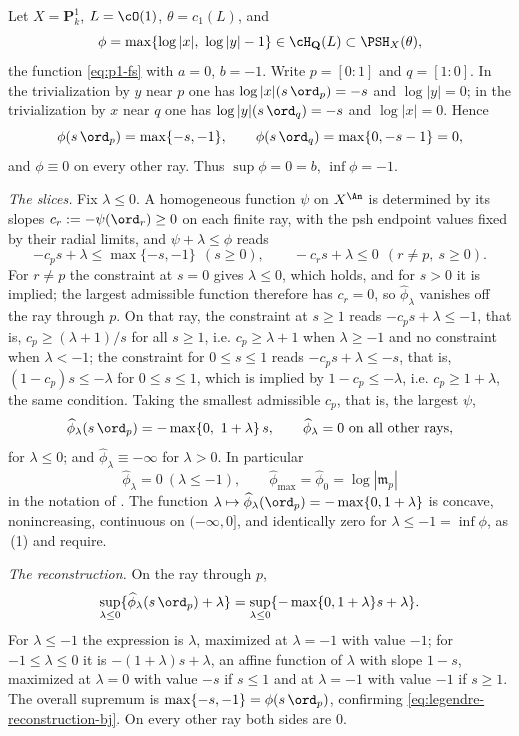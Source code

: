 \begin{example}
\label{ex:ch35-legendre-pair-p1}
Let $X=\mathbf P^1_k$, $L=\cO(1)$, $\theta=c_1(L)$, and
\[
 \phi=\max\{\log|x|,\ \log|y|-1\}
 \in\cH_{\mathbf Q}(L)\subset\PSH_X(\theta),
\]
the function \eqref{eq:p1-fs} with $a=0$, $b=-1$.  Write
$p=[0:1]$ and $q=[1:0]$.  In the trivialization by $y$ near $p$ one
has $\log|x|(s\,\ord_p)=-s$ and $\log|y|=0$; in the trivialization by
$x$ near $q$ one has $\log|y|(s\,\ord_q)=-s$ and $\log|x|=0$.
Hence
\[
 \phi(s\,\ord_p)=\max\{-s,-1\},
 \qquad
 \phi(s\,\ord_q)=\max\{0,-s-1\}=0,
\]
and $\phi\equiv0$ on every other ray.  Thus $\sup\phi=0=b$,
$\inf\phi=-1$.

\emph{The slices.}  Fix $\lambda\leq0$.  A homogeneous function
$\psi$ on $X^{\An}$ is determined by its slopes
$c_r:=-\psi(\ord_r)\geq0$ on each finite ray, with the psh endpoint
values fixed by their radial limits, and
$\psi+\lambda\leq\phi$ reads
\[
 -c_ps+\lambda\leq\max\{-s,-1\}\ \ (s\geq0),
 \qquad
 -c_rs+\lambda\leq0\ \ (r\neq p,\ s\geq0).
\]
For $r\neq p$ the constraint at $s=0$ gives $\lambda\leq0$, which
holds, and for $s>0$ it is implied; the largest admissible function therefore has
$c_r=0$, so $\widehat\phi_\lambda$ vanishes off the ray
through $p$.  On that ray, the constraint at $s\geq1$ reads
$-c_ps+\lambda\leq-1$, that is,
$c_p\geq(\lambda+1)/s$ for all $s\geq1$, i.e.
$c_p\geq\lambda+1$ when $\lambda\geq-1$ and no constraint when
$\lambda<-1$; the constraint for $0\leq s\leq1$ reads
$-c_ps+\lambda\leq-s$, that is,
$(1-c_p)s\leq-\lambda$ for $0\leq s\leq1$, which is implied by
$1-c_p\leq-\lambda$, i.e. $c_p\geq1+\lambda$, the same condition.
Taking the smallest admissible $c_p$, that is, the largest
$\psi$,
\[
 \widehat\phi_\lambda(s\,\ord_p)=-\max\{0,\ 1+\lambda\}\,s,
 \qquad
 \widehat\phi_\lambda=0\ \text{on all other rays},
\]
for $\lambda\leq0$; and $\widehat\phi_\lambda\equiv-\infty$ for
$\lambda>0$.  In particular
\[
 \widehat\phi_\lambda=0\ (\lambda\leq-1),
 \qquad
 \widehat\phi_{\max}=\widehat\phi_0=\log|\mathfrak m_p|
\]
in the notation of .  The function
$\lambda\mapsto\widehat\phi_\lambda(\ord_p)=-\max\{0,1+\lambda\}$ is
concave, nonincreasing, continuous on $(-\infty,0]$, and identically zero
for $\lambda\leq-1=\inf\phi$, as
\,(1) and
 require.

\emph{The reconstruction.}  On the ray through $p$,
\[
 \sup_{\lambda\leq0}\{\widehat\phi_\lambda(s\,\ord_p)+\lambda\}
 =\sup_{\lambda\leq0}\{-\max\{0,1+\lambda\}s+\lambda\} .
\]
For $\lambda\leq-1$ the expression is $\lambda$, maximized at
$\lambda=-1$ with value $-1$; for $-1\leq\lambda\leq0$ it is
$-(1+\lambda)s+\lambda$, an affine function of $\lambda$ with slope
$1-s$, maximized at $\lambda=0$ with value $-s$ if $s\leq1$ and at
$\lambda=-1$ with value $-1$ if $s\geq1$.  The overall supremum is
$\max\{-s,-1\}=\phi(s\,\ord_p)$, confirming
\eqref{eq:legendre-reconstruction-bj}.  On every other ray both sides are
$0$.


\end{example}
